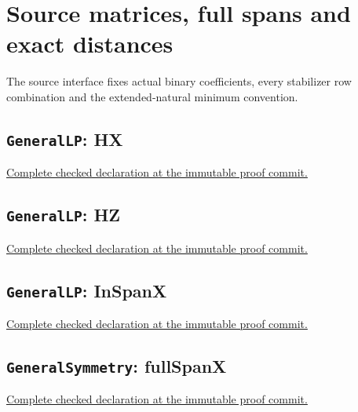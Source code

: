 \clearpage\section{Source matrices, full spans and exact distances}

The source interface fixes actual binary coefficients, every stabilizer row combination and the extended-natural minimum convention.

\subsection*{\texttt{GeneralLP}: HX}

\noindent\href{https://github.com/alectionary/vibe-math/blob/3ae21c0719cedbd928f4f7882f9b9e266567605e/formalization/distance-preservation/GeneralLP.lean#L11-L13}{Complete checked declaration at the immutable proof commit.}



\subsection*{\texttt{GeneralLP}: HZ}

\noindent\href{https://github.com/alectionary/vibe-math/blob/3ae21c0719cedbd928f4f7882f9b9e266567605e/formalization/distance-preservation/GeneralLP.lean#L15-L17}{Complete checked declaration at the immutable proof commit.}



\subsection*{\texttt{GeneralLP}: InSpanX}

\noindent\href{https://github.com/alectionary/vibe-math/blob/3ae21c0719cedbd928f4f7882f9b9e266567605e/formalization/distance-preservation/GeneralLP.lean#L65-L67}{Complete checked declaration at the immutable proof commit.}



\subsection*{\texttt{GeneralSymmetry}: fullSpanX}

\noindent\href{https://github.com/alectionary/vibe-math/blob/3ae21c0719cedbd928f4f7882f9b9e266567605e/formalization/distance-preservation/truncated12/GeneralSymmetry.lean#L22-L23}{Complete checked declaration at the immutable proof commit.}

